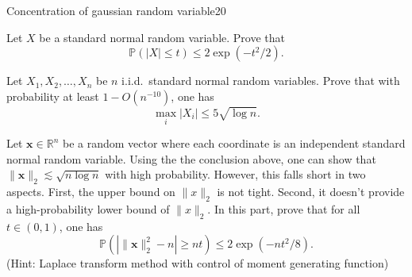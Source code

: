 \documentclass{article}
\begin{document}




\begin{problem}{Concentration of gaussian random variable}{20}

Let $X$ be a standard normal random variable. Prove that 
\[
\mathbb{P} ( |X| \leq t) \leq 2 \exp(- t^2 / 2). 
\]

Let $X_1, X_2, \ldots, X_n$ be $n$ i.i.d.~standard normal random variables. Prove that with probability at least $1- O(n^{-10})$, one has
\[
\max_{i}  |X_i|  \leq 5 \sqrt{\log n}.
\]

Let $\bm{x} \in \mathbb{R}^{n}$ be a random vector where each coordinate is an independent standard normal random variable. Using the the conclusion above, one can show that $\|\bm{x}\|_{2} \lesssim \sqrt{n \log n}$ with high probability. However, this falls short in two aspects. First, the upper bound on $\|x\|_2$ is not tight. Second, it doesn't provide a high-probability lower bound of $\|x\|_2$. In this part, prove that for all $t \in (0,1)$, one has
\[
\mathbb{P}( | \| \bm{x} \|_{2}^2 - n | \geq nt) \leq 2 \exp(-nt^2 / 8).
\]
(Hint: Laplace transform method with control of moment generating function)
\end{problem}
\end{document}
